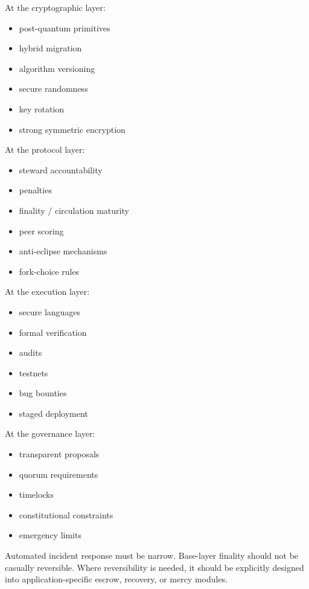 ﻿\documentclass[12pt]{article}
\begin{document}
At the cryptographic layer:

\begin{itemize}
  \item post-quantum primitives
  \item hybrid migration
  \item algorithm versioning
  \item secure randomness
  \item key rotation
  \item strong symmetric encryption
\end{itemize}

At the protocol layer:

\begin{itemize}
  \item steward accountability
  \item penalties
  \item finality / circulation maturity
  \item peer scoring
  \item anti-eclipse mechanisms
  \item fork-choice rules
\end{itemize}

At the execution layer:

\begin{itemize}
  \item secure languages
  \item formal verification
  \item audits
  \item testnets
  \item bug bounties
  \item staged deployment
\end{itemize}

At the governance layer:

\begin{itemize}
  \item transparent proposals
  \item quorum requirements
  \item timelocks
  \item constitutional constraints
  \item emergency limits
\end{itemize}

Automated incident response must be narrow. Base-layer finality should not be casually reversible. Where reversibility is needed, it should be explicitly designed into application-specific escrow, recovery, or mercy modules.
\end{document}

